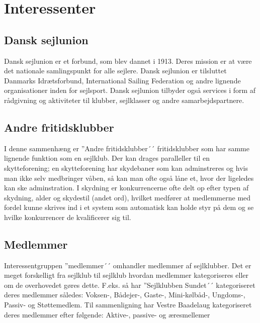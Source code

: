 \chapter{Interessenter}
\section{Dansk sejlunion}
Dansk sejlunion er et forbund, som blev dannet i 1913. 
Deres mission er at være det nationale samlingspunkt for alle sejlere. Dansk sejlunion er tilsluttet Danmarks Idrætsforbund, International Sailing Federation og andre lignende organisationer inden for sejlsport. 
Dansk sejlunion tilbyder også services i form af rådgivning og aktiviteter til klubber, sejlklasser og andre samarbejdspartnere.

\section{Andre fritidsklubber}
I denne sammenhæng er ''Andre fritidsklubber´´ fritidsklubber som har samme lignende funktion som en sejlklub. Der kan drages paralleller til en skytteforening; en skytteforening har skydebaner som kan adminstreres og hvis man ikke selv medbringer våben, så kan man ofte også låne et, hvor der ligeledes kan ske adminstration. I skydning er konkurrencerne ofte delt op efter typen af skydning, alder og skydestil (andet ord), hvilket medfører at medlemmerne med fordel kunne skrives ind i et system som automatisk kan holde styr på dem og se hvilke konkurrencer de kvalificerer sig til.

\section{Medlemmer}
Interessentgruppen ''medlemmer´´ omhandler medlemmer af sejlklubber. Det er meget forskelligt fra sejlklub til sejlklub hvordan medlemmer kategoriseres eller om de overhovedet gøres dette. F.eks. så har ''Sejlklubben Sundet´´ kategoriseret deres medlemmer således: Voksen-, Bådejer-, Gaste-, Mini-kølbåd-, Ungdoms-, Passiv- og Støttemedlem.
Til sammenligning har Vestre Baadelaug kategoriseret deres medlemmer efter følgende: Aktive-, passive- og æresmellemer

